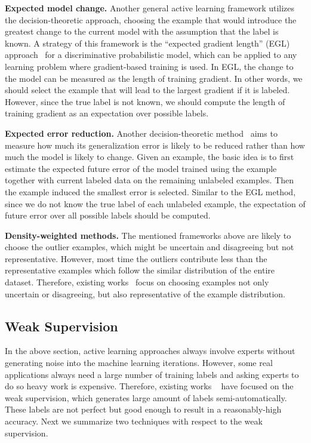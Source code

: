 \textbf{Expected model change.} Another general active learning framework utilizes the decision-theoretic approach, choosing the example that would introduce the greatest change to the current model with the assumption that the label is known. A strategy of  this framework is the “expected gradient length” (EGL) approach~\cite{DBLP:conf/nips/SettlesCR07} for a discriminative probabilistic model, which can be applied to any learning problem  where gradient-based training is used. In EGL, the change to the model can be measured as the length of training gradient. In other words, we should select the example that  will lead to the largest gradient if it is labeled. However, since the true label is not known, we should compute the length of training gradient as an expectation over possible labels.

\textbf{Expected error reduction.} Another decision-theoretic method~\cite{DBLP:conf/icml/RoyM01} aims to measure how much its generalization error is likely to be reduced rather than  how much the model is likely to change. Given an example, the basic idea is to first estimate the expected future error of the model trained using the example together with current labeled data on the remaining unlabeled examples. Then the example induced the smallest error is selected. Similar to the EGL method, since we do not know the true label of each unlabeled example, the expectation of future error over all possible labels should be computed.



\textbf{Density-weighted methods.} The mentioned frameworks above are likely to choose the outlier  examples, which might be uncertain and disagreeing but not representative. However, most time the outliers contribute less than the representative examples which follow the similar distribution of the entire dataset. Therefore, existing works~\cite{DBLP:conf/emnlp/SettlesC08, DBLP:conf/ecir/XuAZ07} focus on choosing examples not only uncertain or disagreeing, but also representative of the example distribution.

\subsection{Weak Supervision}\label{subsec:weak}

In the above section,  active learning approaches  always involve experts without generating noise into the machine learning iterations. However,  some real applications always need a large number of training labels and asking experts to do so heavy work is expensive. Therefore, existing works ~\cite{DBLP:journals/vldb/RatnerBEFWR20, DBLP:conf/aaai/MitchellCHTBCMG15, DBLP:conf/acl/MintzBSJ09} have focused on the weak supervision, which generates large amount of labels semi-automatically. These labels are not perfect but good enough to result in a reasonably-high accuracy. Next we summarize two techniques with respect to the weak supervision.

